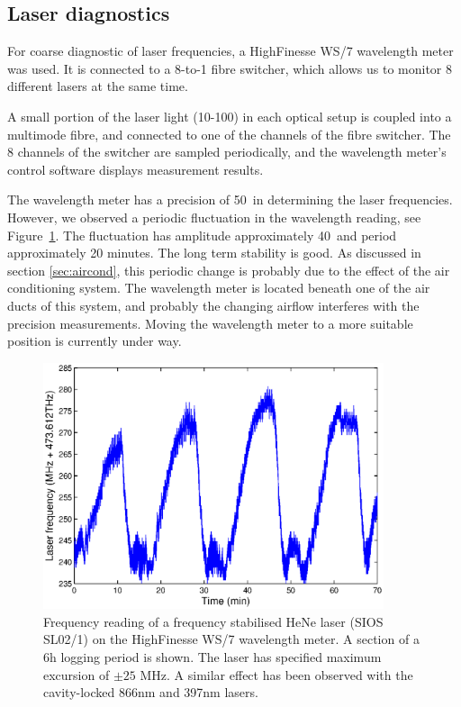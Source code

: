 \subsection{Laser diagnostics}

For coarse diagnostic of laser frequencies, a HighFinesse WS/7 wavelength meter was used. It is connected to a 8-to-1 fibre switcher, which allows us to monitor 8 different lasers at the same time.

A small portion of the laser light (10-100\uW) in each optical setup is coupled into a multimode fibre, and connected to one of the channels of the fibre switcher. The 8 channels of the switcher are sampled periodically, and the wavelength meter's control software displays measurement results.

The wavelength meter has a precision of 50\MHz\, in determining the laser frequencies. However, we observed a periodic fluctuation in the wavelength reading, see Figure~\ref{fig:wavemeterlong}. The fluctuation has amplitude approximately 40\MHz\, and period approximately 20 minutes. The long term stability is good.
As discussed in section \ref{sec:aircond}, this periodic change is probably due to the effect of the air conditioning system. The wavelength meter is located beneath one of the air ducts of this system, and probably the changing airflow interferes with the precision measurements. Moving the wavelength meter to a more suitable position is currently under way. 

\begin{figure}[t]
\centering
\includegraphics[width=10cm]{chapter4/wavemeter/HeNe_long}
\caption[Wavemeter long term diagnostics]{Frequency reading of a frequency stabilised HeNe laser (SIOS SL02/1) on the HighFinesse WS/7 wavelength meter. A section of a 6h logging period is shown. The laser has specified maximum excursion of $\pm 25$ MHz. A similar effect has been observed with the cavity-locked 866nm and 397nm lasers.}
\label{fig:wavemeterlong}
\end{figure} 

